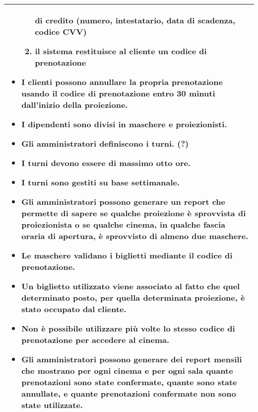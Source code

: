 \begin{tabularx}{\linewidth}{|X|}
\begin{itemize}
\begin{enumerate}
                        di credito (numero, intestatario, data di scadenza,
                        codice CVV)
                  \item il sistema restituisce al cliente un codice di
                        prenotazione
              \end{enumerate}
        \item I clienti possono annullare la propria prenotazione usando il
              codice di prenotazione entro 30 minuti dall'inizio della
              proiezione.
        \item I dipendenti sono divisi in maschere e proiezionisti.
        \item Gli amministratori definiscono i turni. (?)
        \item I turni devono essere di massimo otto ore.
        \item I turni sono gestiti su base settimanale.
        \item Gli amministratori possono generare un report che permette di
              sapere se qualche proiezione è sprovvista di proiezionista o se
              qualche cinema, in qualche fascia oraria di apertura, è sprovvisto
              di almeno due maschere.
        \item Le maschere validano i biglietti mediante il codice
              di prenotazione.
        \item Un biglietto utilizzato viene associato al fatto che quel
              determinato posto, per quella determinata proiezione, è stato
              occupato dal cliente.
        \item Non è possibile utilizzare più volte lo stesso codice di
              prenotazione per accedere al cinema.
        \item Gli amministratori possono generare dei report mensili che
              mostrano per ogni cinema e per ogni sala quante prenotazioni
              sono state confermate, quante sono state annullate, e quante
              prenotazioni confermate non sono state utilizzate.
    \end{itemize}
    \\\hline
\end{tabularx}

\pagebreak


